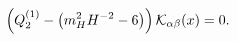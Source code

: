 \begin{equation}
\left( Q_{2}^{(1)}-\left( m^{2}_{H}H^{-2}-6\right) \right){\cal
K}_{\alpha\beta}(x)=0. \label{eq:wave}
\end{equation}

